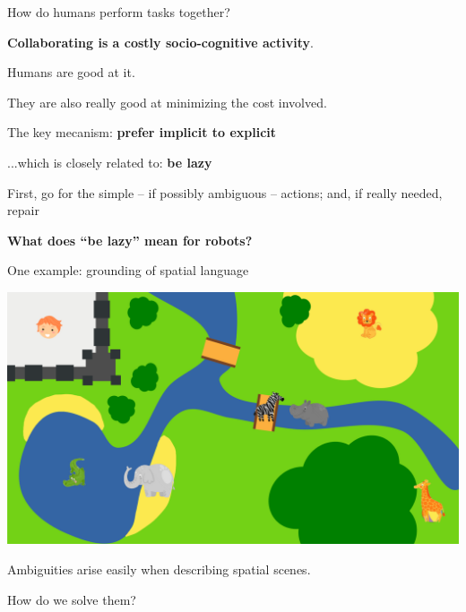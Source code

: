 \documentclass[compress]{beamer}
\begin{document}
\begin{frame}{How do humans perform tasks together?}


    \begin{center}
        {\bf Collaborating is a costly socio-cognitive activity}.

    \pause
    Humans are good at it.
        
    They are also really good at minimizing the cost
    involved.
    \pause
    
        The key mecanism: {\bf prefer implicit to explicit}

    \pause

        ...which is closely related to: {\bf be lazy}
        
        First, go for the simple -- if possibly ambiguous -- actions; and, if
        really needed, repair

    \pause
    \vspace{2cm}
    {\bf What does ``be lazy'' mean for robots?}
    \end{center}
        
\end{frame}

\begin{frame}{One example: grounding of spatial language}


    \begin{center}
        \includegraphics[width=0.9\linewidth]{ambiguous-desc/RefMap}

    Ambiguities arise easily when describing spatial scenes.

    How do we solve them?

    \end{center}

\end{frame}

\end{document}
